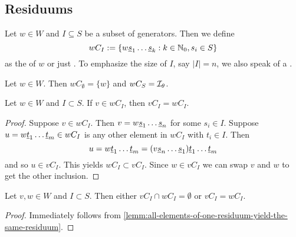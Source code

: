 \subsection{Residuums}
\label{sec:twisted-involutions-residuums}

\begin{defi}
	Let $w \in W$ and $I \subseteq S$ be a subset of generators. Then we define
	$$ wC_I := \{ w \underline{s}_1 \ldots \underline{s}_k : k \in \mathbb{N}_0, s_i \in S \} $$
	as the  of $w$ or just . To emphasize the size of $I$, say $|I| = n$, we also speak of a .
\end{defi}

\begin{exam}
	Let $w \in W$. Then $wC_\emptyset = \{ w \}$ and $wC_S = \mathcal{I}_{\theta}$.
\end{exam}

\begin{lemm}
	Let $w \in W$ and $I \subset S$. If $v \in wC_I$, then $vC_I = wC_I$.

	\begin{proof}
		Suppose $v \in wC_I$. Then $v = w \underline{s}_1 \ldots \underline{s}_n$ for some $s_i \in I$. Suppose $u = w \underline{t}_1 \ldots \underline{t}_m \in wC_I$ is any other element in $wC_I$ with $t_i \in I$. Then
		$$ u = w \underline{t}_1 \ldots \underline{t}_m = (v \underline{s}_n \ldots \underline{s}_1) \underline{t}_1 \ldots \underline{t}_m $$
		and so $u \in vC_I$. This yields $wC_I \subset vC_I$. Since $w \in vC_I$ we can swap $v$ and $w$ to get the other inclusion.
	\end{proof}
\end{lemm}

\begin{coro}
	Let $v, w \in W$ and $I \subset S$. Then either $vC_I \cap wC_I = \emptyset$ or $vC_I = wC_I$.

	\begin{proof}
		Immediately follows from \ref{lemm:all-elements-of-one-residuum-yield-the-same-residuum}.
	\end{proof}
\end{coro}

